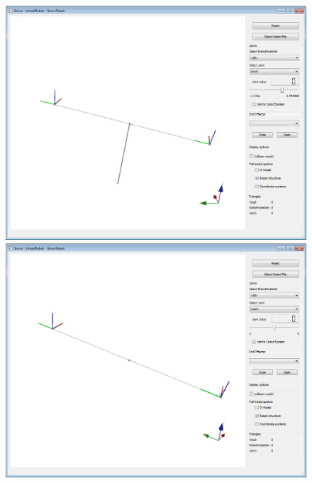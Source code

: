  \par
 \begin{figure}[H]
 	\centering
 	\begin{minipage} {.45\linewidth}
 	  \includegraphics[width=\linewidth]{Tutorial7}
 	\end{minipage}
 	\begin{minipage} {.45\linewidth}
 	  \includegraphics[width=\linewidth]{Tutorial7b}
 	\end{minipage}
 \end{figure}
 \par
